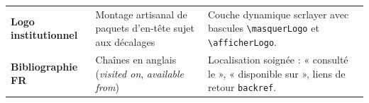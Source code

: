 \begin{table}[htbp]
\begin{tabularx}{\textwidth}{L{3.2cm} L{5.5cm} Y}
    \addlinespace
    \textbf{Logo institutionnel} & Montage artisanal de paquets d'en-tête sujet aux décalages & Couche dynamique \textsf{scrlayer} avec bascules \texttt{\textbackslash masquerLogo} et \texttt{\textbackslash afficherLogo}. \\
    \addlinespace
    \textbf{Bibliographie FR} & Chaînes en anglais (\emph{visited on}, \emph{available from}) & Localisation soignée : « consulté le », « disponible sur », liens de retour \texttt{backref}. \\
    \bottomrule
  \end{tabularx}
\end{table}

